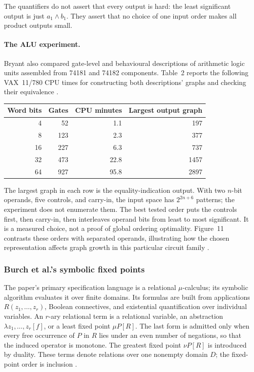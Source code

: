 The quantifiers do not assert that every output is hard:
the least significant output is just \(a_1\land b_1\).
They assert that no choice of one input order makes all
product outputs small.

\paragraph{The ALU experiment.}
Bryant also compared gate-level and behavioural descriptions
of arithmetic logic units assembled from 74181 and 74182
components. Table~2 reports the following VAX~11/780 CPU
times for constructing both descriptions' graphs and checking
their equivalence \cite[\S5 and table~2]{Bryant1986}.
\begin{center}
\begin{tabular}{rrrr}
\hline
Word bits & Gates & CPU minutes & Largest output graph\\
\hline
4  & 52  & 1.1  & 197\\
8  & 123 & 2.3  & 377\\
16 & 227 & 6.3  & 737\\
32 & 473 & 22.8 & 1457\\
64 & 927 & 95.8 & 2897\\
\hline
\end{tabular}
\end{center}
The largest graph in each row is the equality-indication output.
With two \(n\)-bit operands, five controls, and carry-in,
the input space has \(2^{2n+6}\) patterns; the experiment
does not enumerate them. The best tested order puts the
controls first, then carry-in, then interleaves operand
bits from least to most significant. It is a measured
choice, not a proof of global ordering optimality.
Figure~11 contrasts these orders with separated operands,
illustrating how the chosen representation affects graph
growth in this particular circuit family
\cite[fig.~11]{Bryant1986}.

\subsubsection{Burch et al.'s symbolic fixed points}
\label{sec:p09-n-c-017-burch}

The paper's primary specification language is a relational \(\mu\)-calculus;
its symbolic algorithm evaluates it over finite domains. Its formulas are
built from applications
\(R(z_1,\ldots,z_r)\), Boolean connectives, and existential quantification over
individual variables.  An \(r\)-ary relational term is a relational variable,
an abstraction \(\lambda z_1,\ldots,z_r[f]\), or a least fixed point
\(\mu P[R]\).  The last form is admitted only when every free occurrence of
\(P\) in \(R\) lies under an even number of negations, so that the induced
operator is monotone.  The greatest fixed point \(\nu P[R]\) is introduced by
duality. These terms denote relations over one nonempty domain \(D\); the
fixed-point order is inclusion
\cite[\S3]{BurchEtAl1992}.

